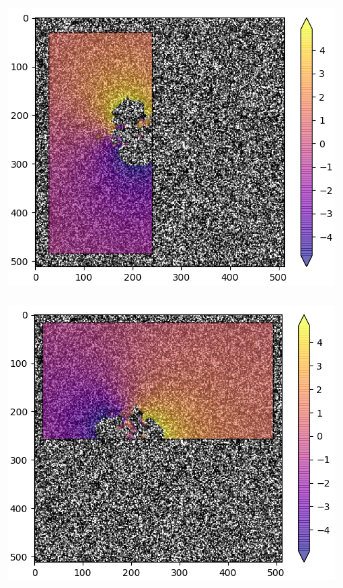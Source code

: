 \documentclass[letterpaper,12pt]{article}
\begin{document}
\begin{figure}[h]
    \centering
    \begin{subfigure}[b]{0.3\textwidth}
    	\centering
        \includegraphics[width=0.95\textwidth]{Python_X_Overlay.PNG}
        \caption{}
        \label{fig:Python_X_Overlay}
    \end{subfigure}
    \begin{subfigure}[b]{0.3\textwidth}
    	\centering
        \includegraphics[width=0.95\textwidth]{Python_Y_Overlay.PNG}
        \caption{}
        \label{fig:Python_Y_Overlay}

\end{subfigure}
\end{figure}
\end{document}
